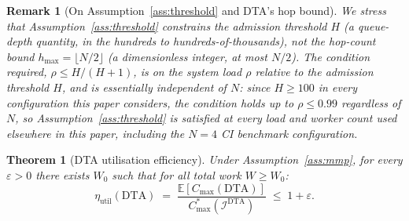 \documentclass[11pt,a4paper]{article}
\newtheorem{theorem}{Theorem}[section]
\newtheorem{remark}{Remark}[section]
\begin{document}
\begin{remark}[On Assumption~\ref{ass:threshold} and DTA's hop bound]
We stress that Assumption~\ref{ass:threshold} constrains the
\emph{admission} threshold $H$ (a queue-depth quantity, in the hundreds
to hundreds-of-thousands), not the \emph{hop-count} bound $h_{\max} =
\lfloor N/2\rfloor$ (a dimensionless integer, at most $N/2$). The
condition required, $\rho \leq H/(H+1)$, is on the \emph{system load}
$\rho$ relative to the admission threshold $H$, and is essentially
independent of $N$: since $H \geq 100$ in every configuration this
paper considers, the condition holds up to $\rho \leq 0.99$ regardless
of $N$, so Assumption~\ref{ass:threshold} is satisfied at every load
and worker count used elsewhere in this paper, including the $N=4$ CI
benchmark configuration.
\end{remark}

\begin{theorem}[DTA utilisation efficiency]\label{thm:dta_info_opt}
Under Assumption~\ref{ass:mmp}, for every $\varepsilon > 0$ there exists
$W_0$ such that for all total work $W \geq W_0$:
\[
  \eta_{\mathrm{util}}(\mathrm{DTA})
  \;=\;
  \frac{\mathbb{E}[C_{\max}(\mathrm{DTA})]}{C_{\max}^*(\mathcal{I}^{\mathrm{DTA}})}
  \;\leq\; 1 + \varepsilon.
\]
\end{theorem}
\end{document}
